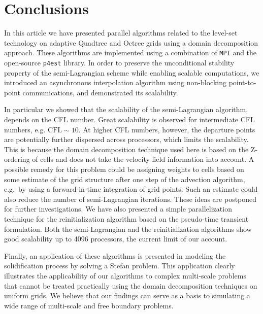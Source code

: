 \section{Conclusions}
In this article we have presented parallel algorithms related to the level-set technology on adaptive Quadtree and Octree grids using a domain decomposition approach. These algorithms are implemented using a combination of \texttt{MPI} and the open-source \texttt{p4est} library. In order to preserve the unconditional stability property of the semi-Lagrangian scheme while enabling scalable computations, we introduced an asynchronous interpolation algorithm using non-blocking point-to-point communications, and demonstrated its scalability. 

In particular we showed that the scalability of the semi-Lagrangian algorithm, depends on the CFL number. Great scalability is observed for intermediate CFL numbers, e.g. $\text{CFL}\sim10$. At higher CFL numbers, however, the departure points are potentially further dispersed across processors, which limits the scalability. This is because the domain decomposition technique used here is based on the Z-ordering of cells and does not take the velocity field information into account. A possible remedy for this problem could be assigning weights to cells based on some estimate of the grid structure after one step of the advection algorithm, e.g.\ by using a forward-in-time integration of grid points. Such an estimate could also reduce the number of semi-Lagrangian iterations. These ideas are postponed for further investigations. We have also presented a simple parallelization technique for the reinitialization algorithm based on the pseudo-time transient formulation. Both the semi-Lagrangian and the reinitialization algorithms show good scalability up to 4096 processors, the current limit of our account. 

Finally, an application of these algorithms is presented in modeling the solidification process by solving a Stefan problem. This application clearly illustrates the applicability of our algorithms to complex multi-scale problems that cannot be treated practically using the domain decomposition techniques on uniform grids. We believe that our findings can serve as a basis to simulating a wide range of multi-scale and free boundary problems.


